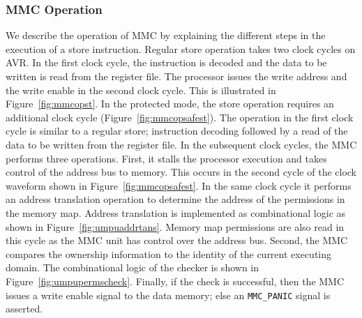 \subsubsection{MMC Operation}
%
We describe the operation of MMC by explaining the different steps in
the execution of a store instruction.
%
Regular store operation takes two clock cycles on AVR.
%
In the first clock cycle, the instruction is decoded and the data to
be written is read from the register file.
%
The processor issues the write address and the write enable in the
second clock cycle.
%
This is illustrated in Figure~\ref{fig:mmcopst}.
%
In the protected mode, the store operation requires an additional
clock cycle (Figure~\ref{fig:mmcopsafest}).
%
The operation in the first clock cycle is similar to a regular store;
instruction decoding followed by a read of the data to be written from
the register file.
%
In the subsequent clock cycles, the MMC performs three operations.
%
First, it stalls the processor execution and takes control of the
address bus to memory.
%
This occurs in the second cycle of the clock waveform shown in
Figure~\ref{fig:mmcopsafest}.
%
In the same clock cycle it performs an address translation operation
to determine the address of the permissions in the memory map.
%
Address translation is implemented as combinational logic as shown in
Figure~\ref{fig:umpuaddrtans}.
%
Memory map permissions are also read in this cycle as the MMC unit has
control over the address bus.
%
Second, the MMC compares the ownership information to the identity of
the current executing domain.
%
The combinational logic of the checker is shown in
Figure~\ref{fig:umpupermscheck}.
%
Finally, if the check is successful, then the MMC issues a write
enable signal to the data memory; else an \texttt{MMC\_PANIC} signal is
asserted.
%
%
